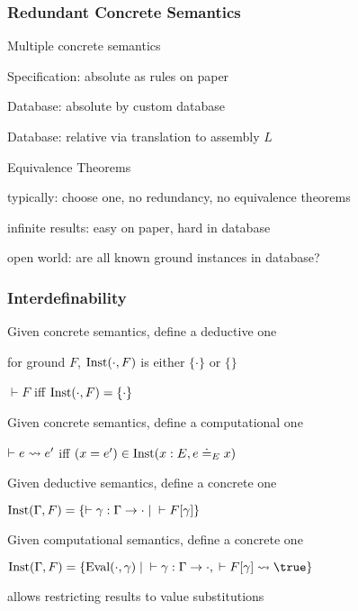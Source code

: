 \begin{frame}\frametitle{Redundant Concrete Semantics}
\begin{blockitems}{Multiple concrete semantics}
\item Specification: absolute as rules on paper
\item Database: absolute by custom database
\item Database: relative via translation to assembly $L$
\end{blockitems}

\begin{blockitems}{Equivalence Theorems}
\item typically: choose one, no redundancy, no equivalence theorems
\item infinite results: easy on paper, hard in database
\item open world: are all known ground instances in database?
\end{blockitems}
\end{frame}

\begin{frame}\frametitle{Interdefinability}
\begin{blockitems}{Given concrete semantics, define a deductive one}
\item for ground $F$, $\mathrm{Inst}(\cdot,F)$ is either $\{\cdot\}$ or $\{\}$
\item $\vdash F$ iff $\mathrm{Inst}(\cdot, F)=\{\cdot\}$
\end{blockitems}

\begin{blockitems}{Given concrete semantics, define a computational one}
\item $\vdash e\rightsquigarrow e'$ iff $(x=e')\in\mathrm{Inst}(x:E, e\doteq_E x)$
\end{blockitems}

\begin{blockitems}{Given deductive semantics, define a concrete one}
\item $\mathrm{Inst}(\Gamma,F)=\{\vdash \gamma:\Gamma\to\cdot \;|\;\vdash F[\gamma]\}$
\end{blockitems}

\begin{blockitems}{Given computational semantics, define a concrete one}
\item $\Inst(\Gamma,F)=\{\Eval(\cdot,\gamma) \;|\;\vdash \gamma:\Gamma\to\cdot, \;\vdash F[\gamma]\rewrites \true\}$
\item allows restricting results to value substitutions
\end{blockitems}
\end{frame}

